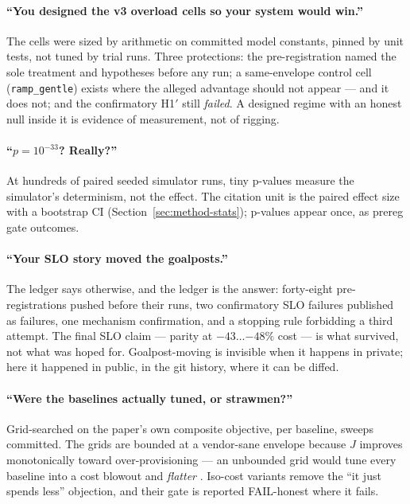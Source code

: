 \paragraph{``You designed the v3 overload cells so your system would
win.''} The cells were sized by arithmetic on committed model constants,
pinned by unit tests, not tuned by trial runs. Three protections: the
pre-registration named the sole treatment and hypotheses before any run; a
same-envelope control cell (\texttt{ramp\_gentle}) exists where the alleged
advantage should not appear --- and it does not; and the confirmatory H1$'$
still \emph{failed}. A designed regime with an honest null inside it is
evidence of measurement, not of rigging.

\paragraph{``$p=10^{-33}$? Really?''} At hundreds of paired seeded simulator
runs, tiny p-values measure the simulator's determinism, not the effect. The
citation unit is the paired effect size with a bootstrap CI
(Section~\ref{sec:method-stats}); p-values appear once, as prereg gate
outcomes.

\paragraph{``Your SLO story moved the goalposts.''} The ledger says
otherwise, and the ledger is the answer: forty-eight pre-registrations pushed
before their runs, two confirmatory SLO failures published as failures, one
mechanism confirmation, and a stopping rule forbidding a third attempt. The
final SLO claim --- parity at $-43\ldots{-48\%}$ cost --- is what survived,
not what was hoped for. Goalpost-moving is invisible when it happens in
private; here it happened in public, in the git history, where it can be
diffed.

\paragraph{``Were the baselines actually tuned, or strawmen?''}
Grid-searched on the paper's own composite objective, per baseline, sweeps
committed. The grids are bounded at a vendor-sane envelope because $J$
improves monotonically toward over-provisioning --- an unbounded grid would
tune every baseline into a cost blowout and \emph{flatter} \polyforge{}.
Iso-cost variants remove the ``it just spends less'' objection, and their
gate is reported FAIL-honest where it fails.

